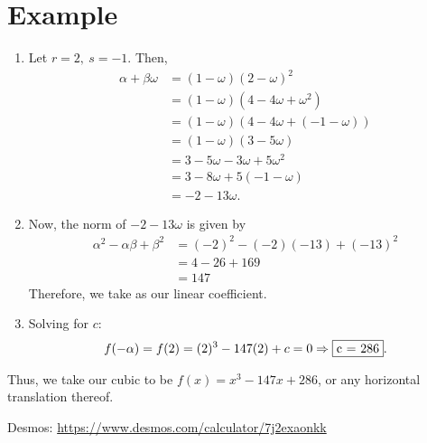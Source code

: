 \documentclass{article}
\begin{document}
\section{Example}
\begin{enumerate}
    \item Let \(r=2,\ s=-1\). Then, 
    \begin{align*}
    \alpha+\beta\omega  &= (1-\omega)(2-\omega)^2 \\
                        &= (1-\omega)(4-4\omega+\omega^2)\\
                        &= (1-\omega)\left(4-4\omega+(-1-\omega)\right)\\
                        &= (1-\omega)(3-5\omega)\\
                        &= 3-5\omega -3\omega+5\omega^2 \\
                        &= 3-8\omega+5(-1-\omega) \\
                        &= -2-13\omega.
    \end{align*}
    \item Now, the norm of \(-2-13\omega\) is given by 
    \begin{align*}
        \alpha^2-\alpha\beta+\beta^2    &= (-2)^2-(-2)(-13)+(-13)^2 \\
                                        &= 4-26+169 \\
                                        &= 147
    \end{align*}
    Therefore, we take  as our linear coefficient.
    \item Solving for \(c\):
    \[
        f(-\alpha) = f(2) = (2)^3-147(2)+c = 0 \Rightarrow \fbox{c = 286}.
    \]
\end{enumerate}

Thus, we take our cubic to be \(f(x) = x^3-147x+286\), or any horizontal translation thereof.

\vspace{1.5in}
Desmos: \url{https://www.desmos.com/calculator/7j2exaonkk}
\end{document}
